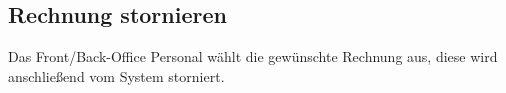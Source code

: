 \documentclass[../SubfileFeatures.tex]{subfiles}
\begin{document}
    \subsection{Rechnung stornieren}
    Das Front/Back-Office Personal wählt die gewünschte Rechnung aus, diese wird anschließend vom System storniert.
\end{document}
